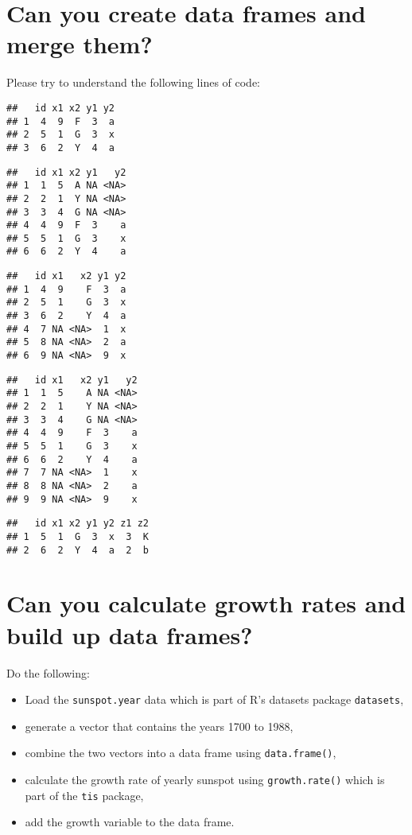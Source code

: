\documentclass[
]{article}
\providecommand{\tightlist}{%
  \setlength{\itemsep}{0pt}\setlength{\parskip}{0pt}}
\begin{document}
\hypertarget{can-you-create-data-frames-and-merge-them}{%
\section{Can you create data frames and merge
them?}\label{can-you-create-data-frames-and-merge-them}}

Please try to understand the following lines of code:

\begin{verbatim}
##   id x1 x2 y1 y2
## 1  4  9  F  3  a
## 2  5  1  G  3  x
## 3  6  2  Y  4  a
\end{verbatim}

\begin{verbatim}
##   id x1 x2 y1   y2
## 1  1  5  A NA <NA>
## 2  2  1  Y NA <NA>
## 3  3  4  G NA <NA>
## 4  4  9  F  3    a
## 5  5  1  G  3    x
## 6  6  2  Y  4    a
\end{verbatim}

\begin{verbatim}
##   id x1   x2 y1 y2
## 1  4  9    F  3  a
## 2  5  1    G  3  x
## 3  6  2    Y  4  a
## 4  7 NA <NA>  1  x
## 5  8 NA <NA>  2  a
## 6  9 NA <NA>  9  x
\end{verbatim}

\begin{verbatim}
##   id x1   x2 y1   y2
## 1  1  5    A NA <NA>
## 2  2  1    Y NA <NA>
## 3  3  4    G NA <NA>
## 4  4  9    F  3    a
## 5  5  1    G  3    x
## 6  6  2    Y  4    a
## 7  7 NA <NA>  1    x
## 8  8 NA <NA>  2    a
## 9  9 NA <NA>  9    x
\end{verbatim}

\begin{verbatim}
##   id x1 x2 y1 y2 z1 z2
## 1  5  1  G  3  x  3  K
## 2  6  2  Y  4  a  2  b
\end{verbatim}

\hypertarget{can-you-calculate-growth-rates-and-build-up-data-frames}{%
\section{Can you calculate growth rates and build up data
frames?}\label{can-you-calculate-growth-rates-and-build-up-data-frames}}

Do the following:

\begin{itemize}
\tightlist
\item
  Load the \texttt{sunspot.year} data which is part of R's datasets
  package \texttt{datasets},
\item
  generate a vector that contains the years 1700 to 1988,
\item
  combine the two vectors into a data frame using \texttt{data.frame()},
\item
  calculate the growth rate of yearly sunspot using
  \texttt{growth.rate()} which is part of the \texttt{tis} package,
\item
  add the growth variable to the data frame.
\end{itemize}
\end{document}
